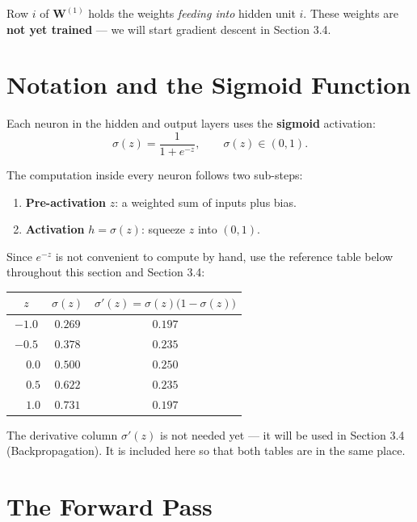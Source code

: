 \documentclass[12pt, a4paper]{article}
\theoremstyle{definition}
\newcommand{\sigmoid}{\sigma}
\newcommand{\bW}{\mathbf{W}}
\begin{document}
Row $i$ of $\bW^{(1)}$ holds the weights \emph{feeding into} hidden unit $i$.
These weights are \textbf{not yet trained} --- we will start gradient descent
in Section 3.4.

\section{Notation and the Sigmoid Function}

Each neuron in the hidden and output layers uses the \textbf{sigmoid}
activation:
\[
  \sigmoid(z) = \frac{1}{1 + e^{-z}}, \qquad \sigmoid(z) \in (0, 1).
\]

The computation inside every neuron follows two sub-steps:
\begin{enumerate}[nosep]
  \item \textbf{Pre-activation} $z$: a weighted sum of inputs plus bias.
  \item \textbf{Activation} $h = \sigmoid(z)$: squeeze $z$ into $(0,1)$.
\end{enumerate}

Since $e^{-z}$ is not convenient to compute by hand, use the reference table
below throughout this section and Section 3.4:

\begin{center}
\renewcommand{\arraystretch}{1.3}
\begin{tabular}{ccc}
\toprule
$z$ & $\sigmoid(z)$ & $\sigmoid'(z) = \sigmoid(z)\bigl(1-\sigmoid(z)\bigr)$ \\
\midrule
$-1.0$ & $0.269$ & $0.197$ \\
$-0.5$ & $0.378$ & $0.235$ \\
$\phantom{-}0.0$ & $0.500$ & $0.250$ \\
$\phantom{-}0.5$ & $0.622$ & $0.235$ \\
$\phantom{-}1.0$ & $0.731$ & $0.197$ \\
\bottomrule
\end{tabular}
\end{center}

\begin{notebox}
The derivative column $\sigmoid'(z)$ is not needed yet --- it will be used
in Section 3.4 (Backpropagation).  It is included here so that both tables
are in the same place.
\end{notebox}

\section{The Forward Pass}
\end{document}
